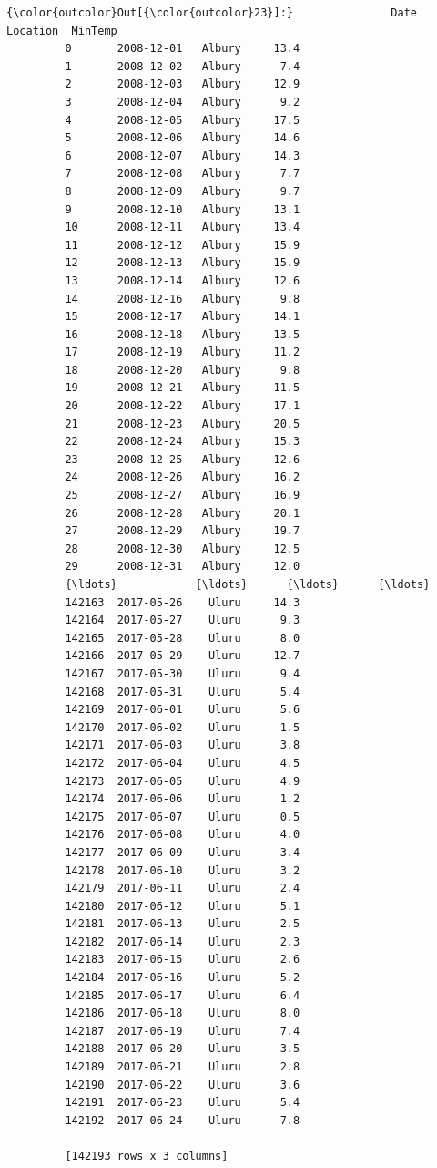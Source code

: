 \documentclass[11pt]{article}
\begin{document}
\begin{Verbatim}[commandchars=\\\{\}]
{\color{outcolor}Out[{\color{outcolor}23}]:}               Date Location  MinTemp
         0       2008-12-01   Albury     13.4
         1       2008-12-02   Albury      7.4
         2       2008-12-03   Albury     12.9
         3       2008-12-04   Albury      9.2
         4       2008-12-05   Albury     17.5
         5       2008-12-06   Albury     14.6
         6       2008-12-07   Albury     14.3
         7       2008-12-08   Albury      7.7
         8       2008-12-09   Albury      9.7
         9       2008-12-10   Albury     13.1
         10      2008-12-11   Albury     13.4
         11      2008-12-12   Albury     15.9
         12      2008-12-13   Albury     15.9
         13      2008-12-14   Albury     12.6
         14      2008-12-16   Albury      9.8
         15      2008-12-17   Albury     14.1
         16      2008-12-18   Albury     13.5
         17      2008-12-19   Albury     11.2
         18      2008-12-20   Albury      9.8
         19      2008-12-21   Albury     11.5
         20      2008-12-22   Albury     17.1
         21      2008-12-23   Albury     20.5
         22      2008-12-24   Albury     15.3
         23      2008-12-25   Albury     12.6
         24      2008-12-26   Albury     16.2
         25      2008-12-27   Albury     16.9
         26      2008-12-28   Albury     20.1
         27      2008-12-29   Albury     19.7
         28      2008-12-30   Albury     12.5
         29      2008-12-31   Albury     12.0
         {\ldots}            {\ldots}      {\ldots}      {\ldots}
         142163  2017-05-26    Uluru     14.3
         142164  2017-05-27    Uluru      9.3
         142165  2017-05-28    Uluru      8.0
         142166  2017-05-29    Uluru     12.7
         142167  2017-05-30    Uluru      9.4
         142168  2017-05-31    Uluru      5.4
         142169  2017-06-01    Uluru      5.6
         142170  2017-06-02    Uluru      1.5
         142171  2017-06-03    Uluru      3.8
         142172  2017-06-04    Uluru      4.5
         142173  2017-06-05    Uluru      4.9
         142174  2017-06-06    Uluru      1.2
         142175  2017-06-07    Uluru      0.5
         142176  2017-06-08    Uluru      4.0
         142177  2017-06-09    Uluru      3.4
         142178  2017-06-10    Uluru      3.2
         142179  2017-06-11    Uluru      2.4
         142180  2017-06-12    Uluru      5.1
         142181  2017-06-13    Uluru      2.5
         142182  2017-06-14    Uluru      2.3
         142183  2017-06-15    Uluru      2.6
         142184  2017-06-16    Uluru      5.2
         142185  2017-06-17    Uluru      6.4
         142186  2017-06-18    Uluru      8.0
         142187  2017-06-19    Uluru      7.4
         142188  2017-06-20    Uluru      3.5
         142189  2017-06-21    Uluru      2.8
         142190  2017-06-22    Uluru      3.6
         142191  2017-06-23    Uluru      5.4
         142192  2017-06-24    Uluru      7.8
         
         [142193 rows x 3 columns]
\end{Verbatim}
            
\end{document}
